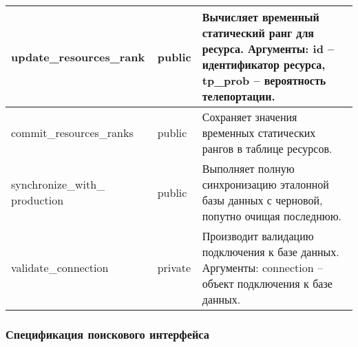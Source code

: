 \begin{xltabular}{\textwidth}{|X|X|X|}
	update\_resources\_rank & public & Вычисляет временный статический ранг для ресурса. Аргументы: id -- идентификатор ресурса, tp\_prob -- вероятность телепортации. \\ \hline
	commit\_resources\_ranks & public & Сохраняет значения временных статических рангов в таблице ресурсов. \\ \hline
	synchronize\_with\_
	production & public & Выполняет полную синхронизацию эталонной базы данных с черновой, попутно очищая последнюю. \\ \hline
	validate\_connection & private & Производит валидацию подключения к базе данных. Аргументы: connection -- объект подключения к базе данных. \\ \hline
\end{xltabular}

\subsubsection{Спецификация поискового интерфейса}

